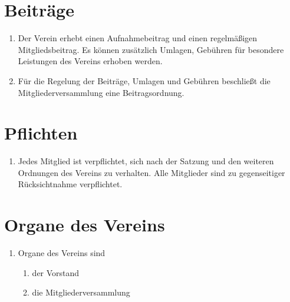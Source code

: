 \documentclass[a4paper,ngerman]{scrartcl}
\begin{document}
\section{Beiträge}
\begin{enumerate}
\item Der Verein erhebt einen Aufnahmebeitrag und einen regelmäßigen Mitgliedsbeitrag. Es können zusätzlich Umlagen, Gebühren für besondere Leistungen des Vereins erhoben werden.
\item Für die Regelung der Beiträge, Umlagen und Gebühren beschließt die Mitgliederversammlung eine Beitragsordnung. \label{Beschluss einer Beitragsordnung}
\end{enumerate}

\section{Pflichten}
\begin{enumerate}
\item Jedes Mitglied ist verpflichtet, sich nach der Satzung und den weiteren Ordnungen des Vereins zu verhalten. Alle Mitglieder sind zu gegenseitiger Rücksichtnahme verpflichtet.
\end{enumerate}

\section{Organe des Vereins}
\begin{enumerate}
\item Organe des Vereins sind
\begin{enumerate}
\item der Vorstand
\item die Mitgliederversammlung
\end{enumerate}
\end{enumerate}
\end{document}
